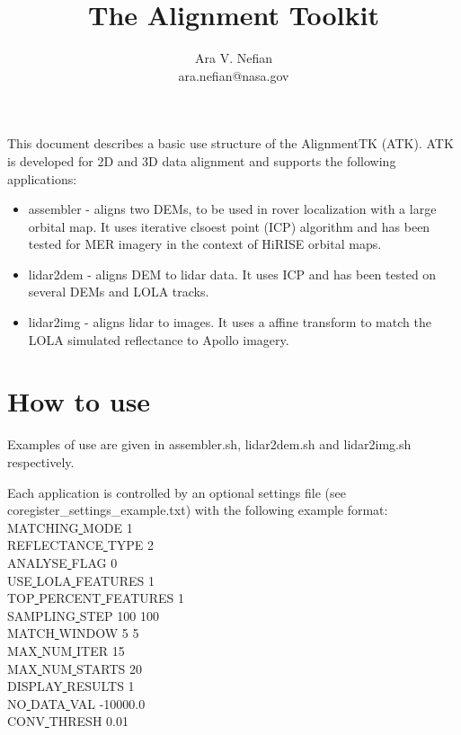 \documentclass[12pt]{article}
\begin{document}
\title {The Alignment Toolkit}
\author{Ara V. Nefian\\
ara.nefian@nasa.gov}
\maketitle

This document describes a basic use structure of the AlignmentTK (ATK). ATK is developed for 2D and 3D data alignment and supports the 
following applications:
\begin{itemize}
\item assembler - aligns two DEMs, to be used in rover localization with a large orbital map. It uses iterative clsoest point (ICP) algorithm and has 
been tested for MER imagery in the context of HiRISE orbital maps.
\item lidar2dem - aligns DEM to lidar data. It uses ICP and has been tested on several DEMs and LOLA tracks.
\item lidar2img - aligns lidar to images. It uses a affine transform to match the LOLA simulated reflectance to Apollo imagery. 
\end{itemize} 

\section{How to use}
Examples of use are given in assembler.sh, lidar2dem.sh and lidar2img.sh respectively.

Each application is controlled by an optional settings file (see coregister_settings_example.txt) with the following example format:\\
MATCHING\underline{ }MODE 1\\
REFLECTANCE\underline{ }TYPE 2\\
ANALYSE\underline{ }FLAG 0\\
USE\underline{ }LOLA\underline{ }FEATURES 1\\
TOP\underline{ }PERCENT\underline{ }FEATURES 1\\
SAMPLING\underline{ }STEP 100 100\\
MATCH\underline{ }WINDOW 5 5\\
MAX\underline{ }NUM\underline{ }ITER 15\\
MAX\underline{ }NUM\underline{ }STARTS 20\\
DISPLAY\underline{ }RESULTS 1\\
NO\underline{ }DATA\underline{ }VAL -10000.0\\
CONV\underline{ }THRESH 0.01\\
\end{document}

